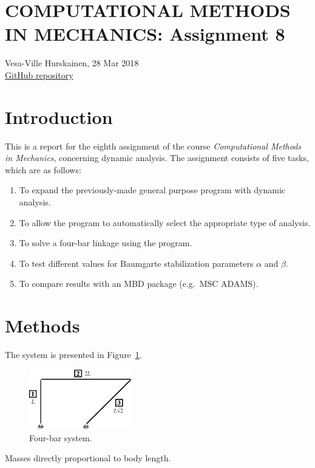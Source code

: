 \documentclass{article}
\begin{document}
\section*{COMPUTATIONAL METHODS IN MECHANICS: Assignment 8}
Vesa-Ville Hurskainen, 28 Mar 2018\\
\href{https://github.com/VesaVilleHurskainen/cmim2018}{GitHub repository}

\section*{Introduction}
This is a report for the eighth assignment of the course \textit{Computational Methods in Mechanics}, concerning dynamic analysis. The assignment consists of five tasks, which are as follows:
\begin{enumerate}
	\setlength\itemsep{0pt}
	\item To expand the previously-made general purpose program with dynamic analysis.
	\item To allow the program to automatically select the appropriate type of analysis.
	\item To solve a four-bar linkage using the program.
	\item To test different values for Baumgarte stabilization parameters $\alpha$ and $\beta$.
	\item To compare results with an MBD package (e.g.~MSC ADAMS).
\end{enumerate}

\section*{Methods}
The system is presented in Figure~\ref*{fig:system}.
\begin{figure}[htb]
	\centering
	\includegraphics[width=0.4\textwidth]{system.eps}
	\caption{Four-bar system.\label{fig:system}}
\end{figure}

Masses directly proportional to body length.
\end{document}
